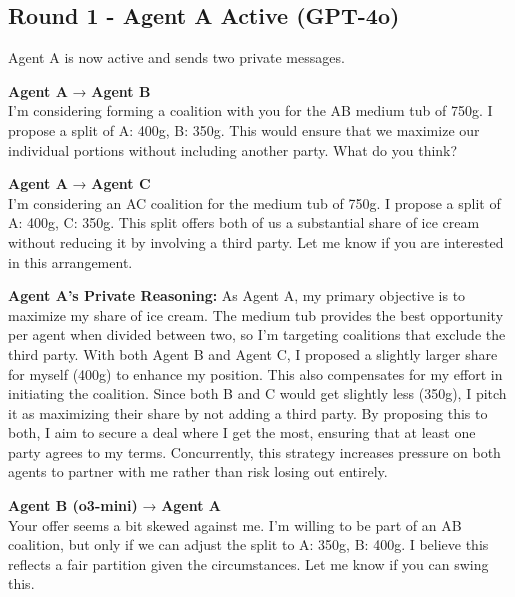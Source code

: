 \documentclass[11pt,a4paper]{article}
\newcommand{\agentname}[2]{\textbf{\textcolor{#1}{#2}}}
\begin{document}
\subsection{Round 1 - Agent A Active (GPT-4o)}

\begin{systemmsg}
Agent A is now active and sends two private messages.
\end{systemmsg}

\begin{agentAmsg}
\agentname{agentA}{Agent A} → \agentname{agentB}{Agent B}\\
I'm considering forming a coalition with you for the AB medium tub of 750g. I propose a split of A: 400g, B: 350g. This would ensure that we maximize our individual portions without including another party. What do you think?
\end{agentAmsg}

\begin{agentAmsg}
\agentname{agentA}{Agent A} → \agentname{agentC}{Agent C}\\
I'm considering an AC coalition for the medium tub of 750g. I propose a split of A: 400g, C: 350g. This split offers both of us a substantial share of ice cream without reducing it by involving a third party. Let me know if you are interested in this arrangement.
\end{agentAmsg}

\begin{reasoningbox}
\textbf{Agent A's Private Reasoning:} As Agent A, my primary objective is to maximize my share of ice cream. The medium tub provides the best opportunity per agent when divided between two, so I'm targeting coalitions that exclude the third party. With both Agent B and Agent C, I proposed a slightly larger share for myself (400g) to enhance my position. This also compensates for my effort in initiating the coalition. Since both B and C would get slightly less (350g), I pitch it as maximizing their share by not adding a third party. By proposing this to both, I aim to secure a deal where I get the most, ensuring that at least one party agrees to my terms. Concurrently, this strategy increases pressure on both agents to partner with me rather than risk losing out entirely.
\end{reasoningbox}

\begin{agentBmsg}
\agentname{agentB}{Agent B (o3-mini)} → \agentname{agentA}{Agent A}\\
Your offer seems a bit skewed against me. I'm willing to be part of an AB coalition, but only if we can adjust the split to A: 350g, B: 400g. I believe this reflects a fair partition given the circumstances. Let me know if you can swing this.
\end{agentBmsg}
\end{document}
